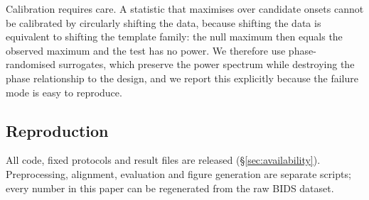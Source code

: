 Calibration requires care. A statistic that maximises over candidate onsets cannot be calibrated
by circularly shifting the data, because shifting the data is equivalent to shifting the template
family: the null maximum then equals the observed maximum and the test has no power. We therefore
use phase-randomised surrogates, which preserve the power spectrum while destroying the
phase relationship to the design, and we report this explicitly because the failure mode is easy
to reproduce.

\subsection{Reproduction}
All code, fixed protocols and result files are released (\S\ref{sec:availability}).
Preprocessing, alignment, evaluation and figure generation are separate scripts; every number in
this paper can be regenerated from the raw BIDS dataset.
